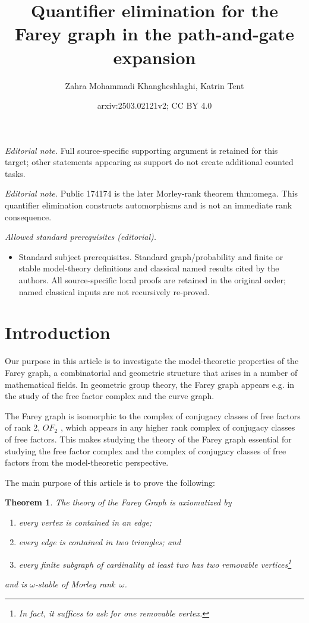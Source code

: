 \documentclass[10pt,a4paper]{amsart}
\title{Quantifier elimination for the Farey graph in the path-and-gate expansion}
\author{Zahra Mohammadi Khangheshlaghi, Katrin Tent}
\date{arxiv:2503.02121v2; CC BY 4.0}
\newtheorem{theorem}[defi]{Theorem}
\begin{document}
\maketitle
\noindent\textit{Editorial note.} Full source-specific supporting argument is retained for this target; other statements appearing as support do not create additional counted tasks.\par\medskip
\noindent\textit{Editorial note.} Public 174174 is the later Morley-rank theorem thm:omega. This quantifier elimination constructs automorphisms and is not an immediate rank consequence.\par\medskip
\noindent\textit{Allowed standard prerequisites (editorial).}\begin{itemize}
\item Standard subject prerequisites. Standard graph/probability and finite or stable model-theory definitions and classical named results cited by the authors. All source-specific local proofs are retained in the original order; named classical inputs are not recursively re-proved.
\end{itemize}\medskip
\section{Introduction}



Our purpose in this article is to investigate the model-theoretic properties of the Farey graph, 
a combinatorial and geometric structure that arises in a number of mathematical fields. 
In geometric group theory, the Farey graph appears e.g. in the study of the free factor complex and the curve graph.

The Farey graph is isomorphic to the complex of conjugacy classes of free factors of rank 2, $OF_2$ \cite{Free_factor_complex_rigidity}, which appears 
in any higher rank complex of conjugacy classes of free factors. This makes studying the theory of the Farey graph essential 
for studying the free factor complex and the complex of conjugacy classes of free factors from the model-theoretic perspective.



The main purpose of this article is to prove the following:

\begin{theorem} \label{main_th}
    The theory of the Farey Graph is axiomatized by
\begin{enumerate}
\item every vertex is contained in an edge;
\item every edge is contained in two triangles; and

\item every finite subgraph of cardinality at least two has two removable vertices\footnote{In fact, it suffices to ask for one removable vertex.}
\end{enumerate}
and   is $\omega$-stable of Morley rank~$\omega$.
\end{theorem}
\end{document}
